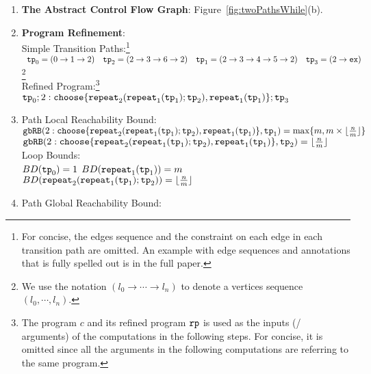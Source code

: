 \begin{enumerate}
  \item  \textbf{The Abstract Control Flow Graph}: Figure~\ref{fig:twoPathsWhile}(b).

  \item \textbf{Program Refinement}:
  \\
  {Simple Transition Paths:\footnote{For concise, the edges sequence and the constraint on each edge in
  each transition path are omitted.
  An example with edge sequences and annotations that is fully spelled out is in the full paper.}}
  \\
$
\begin{array}{llll}
  \mathtt{tp}_0 = (0 \to 1 \to 2)
  &
  \mathtt{tp}_2 = (2 \to 3 \to 6 \to 2)
  &
  \mathtt{tp}_1 = (2 \to 3 \to 4 \to 5 \to 2)
  &
  \mathtt{tp}_3 = (2 \to \mathtt{ex})
  \end{array}
$\footnote{We use the notation $(l_0 \to \cdots \to l_n)$ to denote a vertices sequence $(l_0, \cdots, l_n)$.}
\\
{Refined Program:\footnote{The program $c$ and its refined program $\mathtt{rp}$ is used as the inputs (/ arguments) of the computations in the following steps.
For concise, it is omitted since all the arguments in the following computations are referring to the same program.}}
\\
$
  \tpath_0 ; 
  2: \rpchoose{\rprepeat_2(\rprepeat_1(\tpath_1); \tpath_2) , 
  \rprepeat_1(\tpath_1) }; \tpath_3
$
%
\item {Path Local Reachability Bound}:
\\
$\inoutB(2 :\rpchoose{\rprepeat_2(\rprepeat_1(\tpath_1); \tpath_2) , 
\rprepeat_1(\tpath_1) } , \tpath_1) = \max\{m, m \times \lfloor\frac{n}{m}\rfloor\}$ 
\\
$\inoutB(2: \rpchoose{\rprepeat_2(\rprepeat_1(\tpath_1); \tpath_2) , 
\rprepeat_1(\tpath_1) }, \tpath_2) = \lfloor\frac{n}{m}\rfloor$ 
%
\\
Loop Bounds:
\\
     $ BD(\mathtt{tp}_0) = 1$
      \quad
      $BD(\mathtt{repeat}_1(\mathtt{tp}_1)) = m $
      \quad
      $BD(\mathtt{repeat}_2(\mathtt{repeat}_1(\mathtt{tp}_1); \mathtt{tp}_2)) = \lfloor\frac{n}{m}\rfloor$
%
\item Path Global Reachability Bound:

\end{enumerate}
